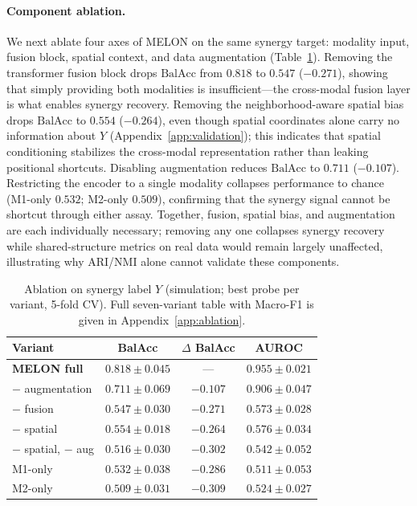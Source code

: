 \documentclass{article}
\theoremstyle{plain}
\theoremstyle{definition}
\newcommand{\melon}{MELON}
\begin{document}
\paragraph{Component ablation.}
We next ablate four axes of MELON on the same synergy target: modality input, fusion block, spatial context, and data augmentation (Table~\ref{tab:sim-ablation}). Removing the transformer fusion block drops $\text{BalAcc}$ from $0.818$ to $0.547$ ($-0.271$), showing that simply providing both modalities is insufficient—the cross-modal fusion layer is what enables synergy recovery. Removing the neighborhood-aware spatial bias drops $\text{BalAcc}$ to $0.554$ ($-0.264$), even though spatial coordinates alone carry no information about $Y$ (Appendix~\ref{app:validation}); this indicates that spatial conditioning stabilizes the cross-modal representation rather than leaking positional shortcuts. Disabling augmentation reduces $\text{BalAcc}$ to $0.711$ ($-0.107$). Restricting the encoder to a single modality collapses performance to chance (M1-only $0.532$; M2-only $0.509$), confirming that the synergy signal cannot be shortcut through either assay. Together, fusion, spatial bias, and augmentation are each individually necessary; removing any one collapses synergy recovery while shared-structure metrics on real data would remain largely unaffected, illustrating why ARI/NMI alone cannot validate these components.

\begin{table}[!htbp]
\centering
\caption{Ablation on synergy label $Y$ (simulation; best probe per variant, 5-fold CV). Full seven-variant table with Macro-F1 is given in Appendix~\ref{app:ablation}.}
\label{tab:sim-ablation}
\small
\begin{tabular}{lccc}
\toprule
Variant & BalAcc & $\Delta$ BalAcc & AUROC \\
\midrule
\textbf{\melon{} full}        & $\mathbf{0.818 \pm 0.045}$ & ---       & $\mathbf{0.955 \pm 0.021}$ \\
\quad $-$ augmentation         & $0.711 \pm 0.069$ & $-0.107$  & $0.906 \pm 0.047$ \\
\quad $-$ fusion               & $0.547 \pm 0.030$ & $-0.271$  & $0.573 \pm 0.028$ \\
\quad $-$ spatial              & $0.554 \pm 0.018$ & $-0.264$  & $0.576 \pm 0.034$ \\
\quad $-$ spatial, $-$ aug     & $0.516 \pm 0.030$ & $-0.302$  & $0.542 \pm 0.052$ \\
\quad M1-only                  & $0.532 \pm 0.038$ & $-0.286$  & $0.511 \pm 0.053$ \\
\quad M2-only                  & $0.509 \pm 0.031$ & $-0.309$  & $0.524 \pm 0.027$ \\
\bottomrule
\end{tabular}
\end{table}
\end{document}
